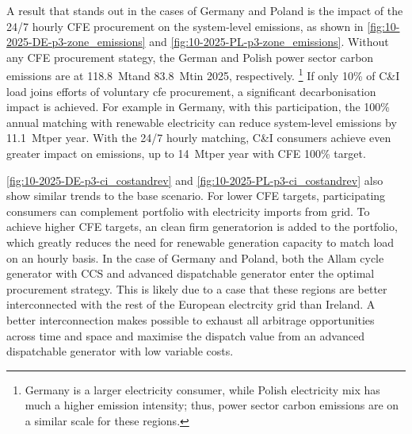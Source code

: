 A result that stands out in the cases of Germany and Poland is the impact of the 24/7 hourly CFE procurement on the system-level \co emissions, as shown in \cref{fig:10-2025-DE-p3-zone_emissions} and \cref{fig:10-2025-PL-p3-zone_emissions}.
Without any CFE procurement stategy, the German and Polish power sector carbon emissions are at 118.8~Mt\co and 83.8~Mt\co in 2025, respectively.%
\footnote{Germany is a larger electricity consumer, while Polish electricity mix has much a higher emission intensity; thus, power sector carbon emissions are on a similar scale for these regions.} 
If only 10\% of C\&I load joins efforts of voluntary \gls{cfe} procurement, a significant decarbonisation impact is achieved. 
For example in Germany, with this participation, the 100\% annual matching with renewable electricity can reduce system-level \co emissions by 11.1~Mt\co per year. 
With the 24/7 hourly matching, C\&I consumers achieve even greater impact on emissions, up to 14~Mt\co per year with CFE 100\% target.

\cref{fig:10-2025-DE-p3-ci_costandrev} and \cref{fig:10-2025-PL-p3-ci_costandrev} also show similar trends to the base scenario. 
For lower CFE targets, participating consumers can complement portfolio with electricity imports from grid. To achieve higher CFE targets, an clean firm generatorion is added to the portfolio, which greatly reduces the need for renewable generation capacity to match load on an hourly basis. 
In the case of Germany and Poland, both the Allam cycle generator with CCS and advanced dispatchable generator enter the optimal procurement strategy. 
This is likely due to a case that these regions are better interconnected with the rest of the European electrcity grid than Ireland. 
A better interconnection makes possible to exhaust all arbitrage opportunities across time and space and maximise the dispatch value from an advanced dispatchable generator with low variable costs.

